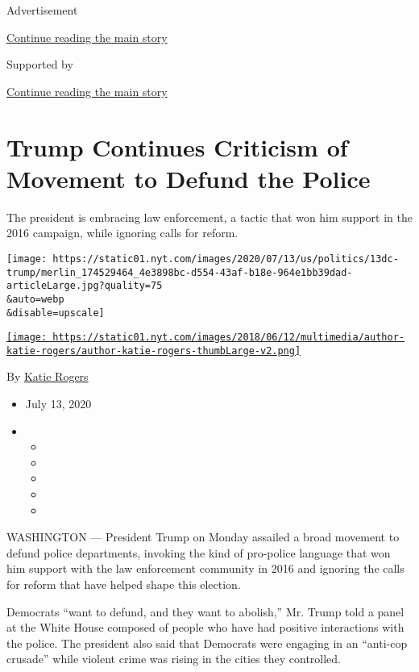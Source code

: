 Advertisement

\protect\hyperlink{after-top}{Continue reading the main story}

Supported by

\protect\hyperlink{after-sponsor}{Continue reading the main story}

\hypertarget{trump-continues-criticism-of-movement-to-defund-the-police}{%
\section{Trump Continues Criticism of Movement to Defund the
Police}\label{trump-continues-criticism-of-movement-to-defund-the-police}}

The president is embracing law enforcement, a tactic that won him
support in the 2016 campaign, while ignoring calls for reform.

\texttt{[image: https://static01.nyt.com/images/2020/07/13/us/politics/13dc-trump/merlin\_174529464\_4e3898bc-d554-43af-b18e-964e1bb39dad-articleLarge.jpg?quality=75\\\&auto=webp\\\&disable=upscale]}

\href{https://www.nytimes.com/by/katie-rogers}{\texttt{[image: https://static01.nyt.com/images/2018/06/12/multimedia/author-katie-rogers/author-katie-rogers-thumbLarge-v2.png]}}

By \href{https://www.nytimes.com/by/katie-rogers}{Katie Rogers}

\begin{itemize}
\item
  July 13, 2020
\item
  \begin{itemize}
  \item
  \item
  \item
  \item
  \item
  \end{itemize}
\end{itemize}

WASHINGTON --- President Trump on Monday assailed a broad movement to
defund police departments, invoking the kind of pro-police language that
won him support with the law enforcement community in 2016 and ignoring
the calls for reform that have helped shape this election.

Democrats ``want to defund, and they want to abolish,'' Mr. Trump told a
panel at the White House composed of people who have had positive
interactions with the police. The president also said that Democrats
were engaging in an ``anti-cop crusade'' while violent crime was rising
in the cities they controlled.

